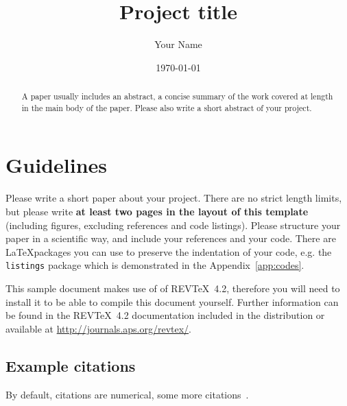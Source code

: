 \title{Project title}

\author{Your Name}

\date{\today}%

\begin{abstract}
A paper usually includes an abstract, a concise summary of the work covered at length in the main body of the paper. Please also write a short abstract of your project.
\end{abstract}


\maketitle




\section{Guidelines}



Please write a short paper about your project. There are no strict length limits, but please write \textbf{at least two pages in the layout of this template} (including figures, excluding references and code listings). Please structure your paper in a scientific way, and include your references and your code. There are \LaTeX packages you can use to preserve the indentation of your code, e.g. the \texttt{listings} package which is demonstrated in the Appendix~\ref{app:codes}.

This sample document makes use of of REV\TeX~4.2, therefore you will need to install it to be able to compile this document yourself. Further information can be found in the REV\TeX~4.2
documentation included in the distribution or available at
\url{http://journals.aps.org/revtex/}.



\subsection{Example citations}
By default, citations are numerical\cite{epr}, some more citations~\cite{feyn54,Bire82,Berman1983,witten2001,Davies1998}. 

